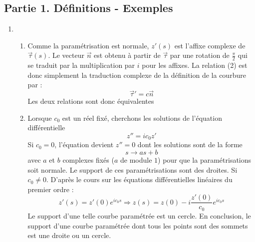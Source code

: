 \subsection*{Partie 1. Définitions - Exemples}
\begin{enumerate}
 \item \begin{enumerate}
 \item Comme la paramétrisation est normale, $z'(s)$ est l'affixe complexe de $\overrightarrow \tau (s)$. Le vecteur $\overrightarrow n$ est obtenu à partir de $\overrightarrow \tau$ par une rotation de $\frac{\pi}{2}$ qui se traduit par la multiplication par $i$ pour les affixes. La relation (2) est donc simplement la traduction complexe de la définition de la courbure par :
\begin{displaymath}
 \overrightarrow \tau ' = c \overrightarrow n
\end{displaymath}
Les deux relations sont donc équivalentes
\item Lorsque $c_0$ est un réel fixé, cherchons les solutions de l'équation différentielle
\begin{displaymath}
 z''=ic_0z'
\end{displaymath}
Si $c_0=0$, l'équation devient $z''=0$ dont les solutions sont de la forme
\begin{displaymath}
 s \rightarrow as +b
\end{displaymath}
avec $a$ et $b$ complexes fixés ($a$ de module $1$) pour que la paramétrisations soit normale. Le support de ces paramétrisations sont des droites.\newline
Si $c_0\neq 0$. D'après le cours sur les équations différentielles linéaires du premier ordre :
\begin{displaymath}
 z'(s)=z'(0)e^{ic_0s} \Rightarrow z(s)=z(0) - i\dfrac{z'(0)}{c_0}e^{ic_0s}
\end{displaymath}
Le support d'une telle courbe paramétrée est un cercle.\newline
En conclusion, le support d'une courbe paramétrée dont tous les points sont des sommets est une droite ou un cercle.


\end{enumerate}
\end{enumerate}
